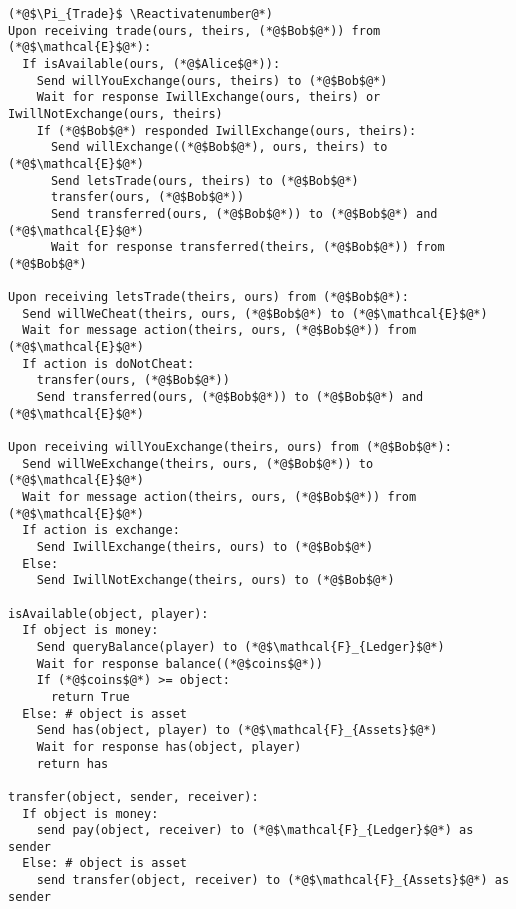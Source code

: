 \Suppressnumber
\begin{lstlisting}[label=tradeprot, style=numbers]
(*@$\Pi_{Trade}$ \Reactivatenumber@*)
Upon receiving trade(ours, theirs, (*@$Bob$@*)) from (*@$\mathcal{E}$@*):
  If isAvailable(ours, (*@$Alice$@*)):
    Send willYouExchange(ours, theirs) to (*@$Bob$@*)
    Wait for response IwillExchange(ours, theirs) or IwillNotExchange(ours, theirs)
    If (*@$Bob$@*) responded IwillExchange(ours, theirs):
      Send willExchange((*@$Bob$@*), ours, theirs) to (*@$\mathcal{E}$@*)
      Send letsTrade(ours, theirs) to (*@$Bob$@*)
      transfer(ours, (*@$Bob$@*))
      Send transferred(ours, (*@$Bob$@*)) to (*@$Bob$@*) and (*@$\mathcal{E}$@*)
      Wait for response transferred(theirs, (*@$Bob$@*)) from (*@$Bob$@*)

Upon receiving letsTrade(theirs, ours) from (*@$Bob$@*):
  Send willWeCheat(theirs, ours, (*@$Bob$@*) to (*@$\mathcal{E}$@*)
  Wait for message action(theirs, ours, (*@$Bob$@*)) from (*@$\mathcal{E}$@*)
  If action is doNotCheat:
    transfer(ours, (*@$Bob$@*))
    Send transferred(ours, (*@$Bob$@*)) to (*@$Bob$@*) and (*@$\mathcal{E}$@*)
  
Upon receiving willYouExchange(theirs, ours) from (*@$Bob$@*):
  Send willWeExchange(theirs, ours, (*@$Bob$@*)) to (*@$\mathcal{E}$@*)
  Wait for message action(theirs, ours, (*@$Bob$@*)) from (*@$\mathcal{E}$@*)
  If action is exchange:
    Send IwillExchange(theirs, ours) to (*@$Bob$@*)
  Else:
    Send IwillNotExchange(theirs, ours) to (*@$Bob$@*)

isAvailable(object, player):
  If object is money:
    Send queryBalance(player) to (*@$\mathcal{F}_{Ledger}$@*)
    Wait for response balance((*@$coins$@*))
    If (*@$coins$@*) >= object:
      return True
  Else: # object is asset
    Send has(object, player) to (*@$\mathcal{F}_{Assets}$@*)
    Wait for response has(object, player)
    return has

transfer(object, sender, receiver):
  If object is money:
    send pay(object, receiver) to (*@$\mathcal{F}_{Ledger}$@*) as sender
  Else: # object is asset
    send transfer(object, receiver) to (*@$\mathcal{F}_{Assets}$@*) as sender
\end{lstlisting}
